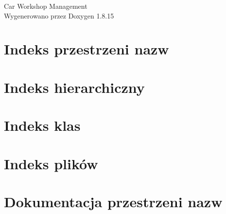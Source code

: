 \let\mypdfximage\pdfximage\def\pdfximage{\immediate\mypdfximage}\documentclass[twoside]{book}
\newcommand{\+}{\discretionary{\mbox{\scriptsize$\hookleftarrow$}}{}{}}
\newcommand{\clearemptydoublepage}{%
  \newpage{\pagestyle{empty}\cleardoublepage}%
}
\begin{document}
\begin{titlepage}
\vspace*{7cm}
\begin{center}%
{\Large Car Workshop Management }\\
\vspace*{1cm}
{\large Wygenerowano przez Doxygen 1.8.15}\\
\end{center}
\end{titlepage}
\clearemptydoublepage
{}
\tableofcontents
\clearemptydoublepage
{}

\chapter{Indeks przestrzeni nazw}

\chapter{Indeks hierarchiczny}

\chapter{Indeks klas}

\chapter{Indeks plików}

\chapter{Dokumentacja przestrzeni nazw}

\end{document}
